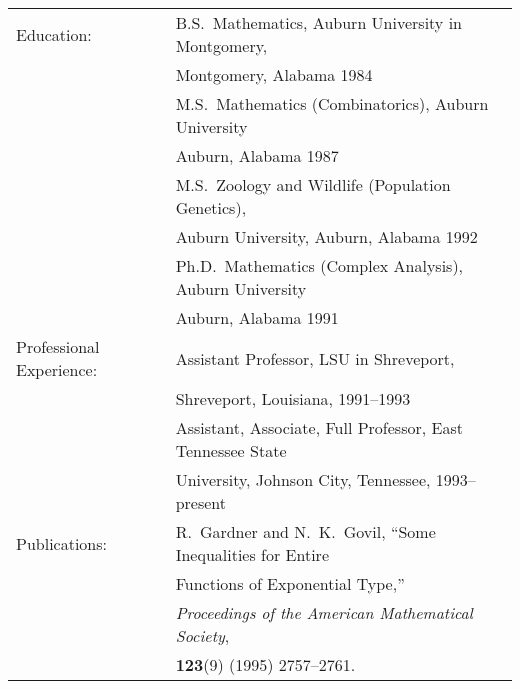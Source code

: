\documentclass[12pt]{etsu_thesis}
\begin{document}
\noindent
\begin{tabular}{ll}
Education:               & B.S.\ Mathematics, Auburn University in Montgomery,\\
\rule[0in]{0in}{.2in}    & \hspace{.25in} Montgomery, Alabama 1984\\
\rule[0in]{0in}{.2in}    & M.S.\ Mathematics (Combinatorics), Auburn University\\
\rule[0in]{0in}{.2in}    & \hspace{.25in} Auburn, Alabama 1987\\
\rule[0in]{0in}{.2in}    & M.S.\ Zoology and Wildlife (Population Genetics), \\
\rule[0in]{0in}{.2in}    & \hspace{.25in} Auburn University, Auburn, Alabama 1992\\
\rule[0in]{0in}{.2in}    & Ph.D.\ Mathematics (Complex Analysis), Auburn University\\
\rule[0in]{0in}{.2in}    & \hspace{.25in} Auburn, Alabama 1991\\

\rule[0in]{0in}{.4in}
Professional Experience: \hspace{.1in} & Assistant Professor, LSU in Shreveport,\\
\rule[0in]{0in}{.2in}    & \hspace{.25in} Shreveport, Louisiana, 1991--1993\\
\rule[0in]{0in}{.2in}    & Assistant, Associate, Full Professor, East Tennessee State \\
\rule[0in]{0in}{.2in}    & \hspace{.25in} University, Johnson City, Tennessee, 1993--present\\

\rule[0in]{0in}{.4in}
Publications:            & R.\ Gardner and N.\ K.\ Govil, ``Some Inequalities for Entire\\
\rule[0in]{0in}{.2in}    & \hspace{.25in}  Functions of Exponential Type,'' \\
\rule[0in]{0in}{.2in}    & \hspace{.25in} {\it Proceedings of the American Mathematical Society},\\
\rule[0in]{0in}{.2in}    & \hspace{.25in} {\bf 123}(9) (1995) 2757--2761.

\end{tabular}
\end{document}
